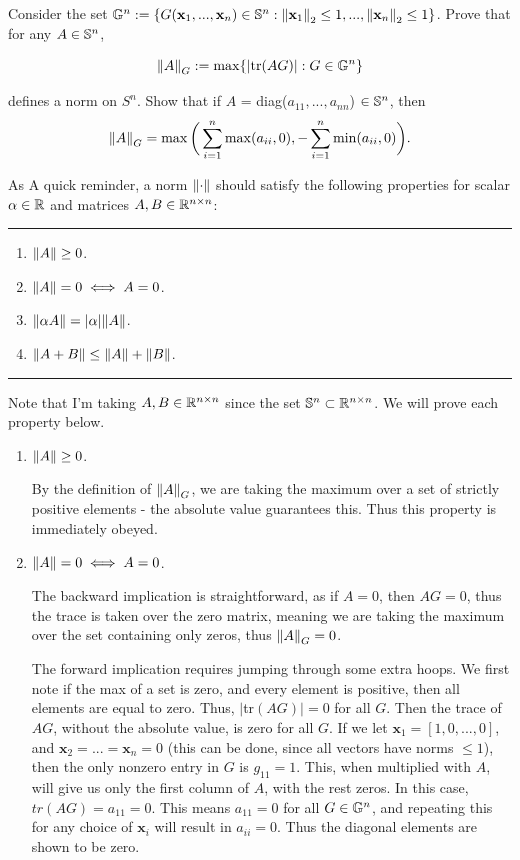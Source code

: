 Consider the set $\G^n := \{G(\textbf{x}_1, ..., \textbf{x}_n) \in \S^n : \norm{\textbf{x}_1}_2 \leq 1, ..., \norm{\textbf{x}_n}_2 \leq 1 \}$. Prove that for any $A \in \S^n$,

\[
\norm{A}_G := \max \{ |\text{tr}(AG)| : G \in \G^n \}
\]

defines a norm on $S^n$. Show that if $A$ = diag($a_{11}, ..., a_{nn}$) $\in \S^n$, then 
\[
\norm{A}_G = \max\bigg( \sum_{i = 1}^n \max (a_{ii}, 0), -\sum_{i = 1}^n \min (a_{ii}, 0)\bigg).
\]

\partbreak
\begin{solution}

    As A quick reminder, a norm $\norm{\cdot}$ should satisfy the following properties for scalar $\alpha \in \R$ and matrices $A, B \in \R^{n\times n}$:
    \jump
    \hrule
    \begin{enumerate}[(1)]
        \item $\norm{A} \geq 0$.
        \item $\norm{A} = 0 \iff A = 0$.
        \item $\norm{\alpha A} = |\alpha| \norm{A}$.
        \item $\norm{A + B} \leq \norm{A} + \norm{B}$.
    \end{enumerate}
    \hrule
    \jump
    Note that I'm taking $A, B \in \R^{n\times n}$ since the set $\S^n \subset \R^{n\times n}$. We will prove each property below.

    \begin{enumerate}[(1)]
        \item $\norm{A} \geq 0$.

        By the definition of $\norm{A}_G$, we are taking the maximum over a set of strictly positive elements - the absolute value guarantees this. Thus this property is immediately obeyed.

        \jump
        \item $\norm{A} = 0 \iff A = 0$.

        The backward implication is straightforward, as if $A = 0$, then $AG = 0$, thus the trace is taken over the zero matrix, meaning we are taking the maximum over the set containing only zeros, thus $\norm{A}_G = 0$.

        The forward implication requires jumping through some extra hoops. We first note if the max of a set is zero, and every element is positive, then all elements are equal to zero. Thus, $|$tr$(AG)| = 0$ for all $G$. Then the trace of $AG$, without the absolute value, is zero for all $G$. If we let $\textbf{x}_1 = [1, 0, ..., 0]$, and $\textbf{x}_2 = ... = \textbf{x}_n = 0$ (this can be done, since all vectors have norms $\leq 1$), then the only nonzero entry in $G$ is $g_{11} = 1$. This, when multiplied with $A$, will give us only the first column of $A$, with the rest zeros. In this case, $tr(AG) = a_{11} = 0$. This means $a_{11} = 0$ for all $G \in \G^n$, and repeating this for any choice of $\textbf{x}_i$ will result in $a_{ii} = 0$. Thus the diagonal elements are shown to be zero.  


\end{enumerate}
\end{solution}
